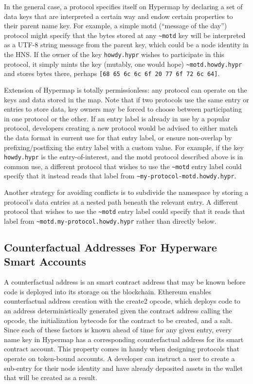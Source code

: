 \documentclass[runningheads]{llncs}
\begin{document}
In the general case, a protocol specifies itself on Hypermap by declaring a set of data keys that are interpreted a certain way and endow certain properties to their parent name key.
For example, a simple motd (``message of the day'') protocol might specify that the bytes stored at any \verb|~motd| key will be interpreted as a UTF-8 string message from the parent key, which could be a node identity in the HNS.
If the owner of the key \verb|howdy.hypr| wishes to participate in this protocol, it simply mints the key (mutably, one would hope) \verb|~motd.howdy.hypr| and stores bytes there, perhaps \verb|[68 65 6c 6c 6f 20 77 6f 72 6c 64]|.

Extension of Hypermap is totally permissionless: any protocol can operate on the keys and data stored in the map.
Note that if two protocols use the same entry or entries to store data, key owners may be forced to choose between participating in one protocol or the other.
If an entry label is already in use by a popular protocol, developers creating a new protocol would be advised to either match the data format in current use for that entry label, or ensure non-overlap by prefixing/postfixing the entry label with a custom value.
For example, if the key \verb|howdy.hypr| is the entry-of-interest, and the motd protocol described above is in common use, a different protocol that wishes to use the \verb|~motd| entry label could specify that it instead reads that label from \verb|~my-protocol-motd.howdy.hypr|.

Another strategy for avoiding conflicts is to subdivide the namespace by storing a protocol's data entries at a nested path beneath the relevant entry.
A different protocol that wishes to use the \verb|~motd| entry label could specify that it reads that label from \verb|~motd.my-protocol.howdy.hypr| rather than directly below.

\subsection{Counterfactual Addresses For Hyperware Smart Accounts}

A counterfactual address is an smart contract address that may be known before code is deployed into its storage on the blockchain.
Ethereum enables counterfactual address creation with the create2 opcode, which deploys code to an address deterministically generated given the contract address calling the opcode, the initialization bytecode for the contract to be created, and a salt.
Since each of these factors is known ahead of time for any given entry, every name key in Hypermap has a corresponding counterfactual address for its smart contract account.
This property comes in handy when designing protocols that operate on token-bound accounts.
A developer can instruct a user to create a sub-entry for their node identity and have already deposited assets in the wallet that will be created as a result.
\end{document}
